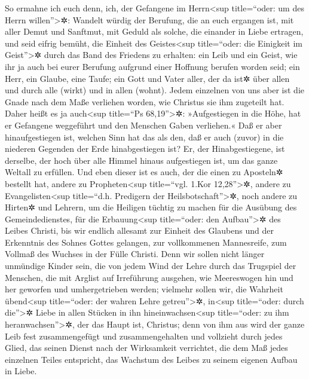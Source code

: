  So ermahne ich euch denn, ich, der Gefangene im
Herrn\textless sup title=``oder: um des Herrn willen''\textgreater✲:
Wandelt würdig der Berufung, die an euch ergangen ist, 
mit aller Demut und Sanftmut, mit Geduld als solche, die einander in
Liebe ertragen,  und seid eifrig bemüht, die Einheit des
Geistes\textless sup title=``oder: die Einigkeit im Geist''\textgreater✲
durch das Band des Friedens zu erhalten:  ein Leib und ein
Geist, wie ihr ja auch bei eurer Berufung aufgrund einer Hoffnung
berufen worden seid;  ein Herr, ein Glaube, eine Taufe;
 ein Gott und Vater aller, der da ist✲ über allen und
durch alle (wirkt) und in allen (wohnt).  Jedem einzelnen
von uns aber ist die Gnade nach dem Maße verliehen worden, wie Christus
sie ihm zugeteilt hat.  Daher heißt es ja
auch\textless sup title=``Ps 68,19''\textgreater✲: »Aufgestiegen in die
Höhe, hat er Gefangene weggeführt und den Menschen Gaben verliehen.«
 Daß er aber hinaufgestiegen ist, welchen Sinn hat das als
den, daß er auch (zuvor) in die niederen Gegenden der Erde
hinabgestiegen ist?  Er, der Hinabgestiegene, ist
derselbe, der hoch über alle Himmel hinaus aufgestiegen ist, um das
ganze Weltall zu erfüllen.  Und eben dieser ist es auch,
der die einen zu Aposteln✲ bestellt hat, andere zu
Propheten\textless sup title=``vgl. 1.Kor 12,28''\textgreater✲, andere
zu Evangelisten\textless sup title=``d.h. Predigern der
Heilsbotschaft''\textgreater✲, noch andere zu Hirten✲ und Lehrern,
 um die Heiligen tüchtig zu machen für die Ausübung des
Gemeindedienstes, für die Erbauung\textless sup title=``oder: den
Aufbau''\textgreater✲ des Leibes Christi,  bis wir
endlich allesamt zur Einheit des Glaubens und der Erkenntnis des Sohnes
Gottes gelangen, zur vollkommenen Mannesreife, zum Vollmaß des Wuchses
in der Fülle Christi.  Denn wir sollen nicht länger
unmündige Kinder sein, die von jedem Wind der Lehre durch das Trugspiel
der Menschen, die mit Arglist auf Irreführung ausgehen, wie Meereswogen
hin und her geworfen und umhergetrieben werden;  vielmehr
sollen wir, die Wahrheit übend\textless sup title=``oder: der wahren
Lehre getreu''\textgreater✲, in\textless sup title=``oder: durch
die''\textgreater✲ Liebe in allen Stücken in ihn
hineinwachsen\textless sup title=``oder: zu ihm
heranwachsen''\textgreater✲, der das Haupt ist, Christus;
 denn von ihm aus wird der ganze Leib fest zusammengefügt
und zusammengehalten und vollzieht durch jedes Glied, das seinen Dienst
nach der Wirksamkeit verrichtet, die dem Maß jedes einzelnen Teiles
entspricht, das Wachstum des Leibes zu seinem eigenen Aufbau in Liebe.

